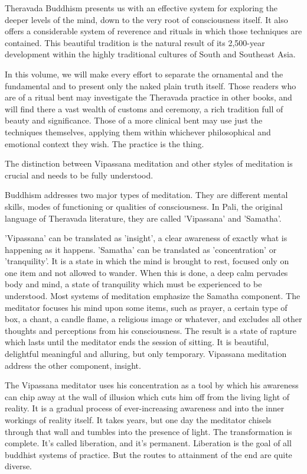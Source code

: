 Theravada Buddhism presents us with an effective system for exploring the deeper levels of the mind, down to the very root of
consciousness itself. It also offers a considerable system of reverence and rituals in which those techniques are contained. This
beautiful tradition is the natural result of its 2,500-year development within the highly traditional cultures of South and Southeast
Asia.

In this volume, we will make every effort to separate the ornamental and the fundamental and to present only the naked plain truth
itself. Those readers who are of a ritual bent may investigate the Theravada practice in other books, and will find there a vast
wealth of customs and ceremony, a rich tradition full of beauty and significance. Those of a more clinical bent may use just the
techniques themselves, applying them within whichever philosophical and emotional context they wish. The practice is the thing.

The distinction between Vipassana meditation and other styles of meditation is crucial and needs to be fully understood.

Buddhism addresses two major types of meditation. They are different mental skills, modes of functioning or qualities of
consciousness. In Pali, the original language of Theravada literature, they are called 'Vipassana' and 'Samatha'.

'Vipassana' can be translated as 'insight', a clear awareness of exactly what is happening as it happens. 'Samatha' can be translated
as 'concentration' or 'tranquility'. It is a state in which the mind is brought to rest, focused only on one item and not allowed to
wander. When this is done, a deep calm pervades body and mind, a state of tranquility which must be experienced to be
understood. Most systems of meditation emphasize the Samatha component. The meditator focuses his mind upon some items,
such as prayer, a certain type of box, a chant, a candle flame, a religious image or whatever, and excludes all other thoughts and
perceptions from his consciousness. The result is a state of rapture which lasts until the meditator ends the session of sitting. It is
beautiful, delightful meaningful and alluring, but only temporary. Vipassana meditation address the other component, insight.

The Vipassana meditator uses his concentration as a tool by which his awareness can chip away at the wall of illusion which cuts
him off from the living light of reality. It is a gradual process of ever-increasing awareness and into the inner workings of reality
itself. It takes years, but one day the meditator chisels through that wall and tumbles into the presence of light. The transformation
is complete. It's called liberation, and it's permanent. Liberation is the goal of all buddhist systems of practice. But the routes to
attainment of the end are quite diverse.

